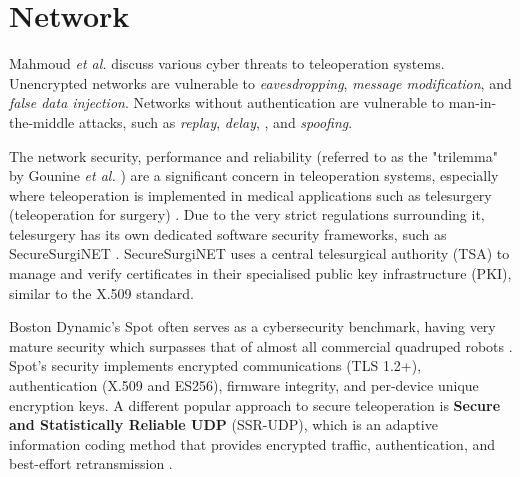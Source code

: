 \newpage
\section{Network}

Mahmoud \textit{et al.} \cite{bib:networks_survey} discuss various cyber threats to teleoperation systems. Unencrypted networks are vulnerable to \textit{eavesdropping}, \textit{message modification}, and \textit{false data injection}. Networks without authentication are vulnerable to man-in-the-middle attacks, such as \textit{replay}, \textit{delay}, , and \textit{spoofing}.


The network security, performance and reliability (referred to as the "trilemma" by Gounine \textit{et al.} \cite{bib:networks_surgery_2}) are a significant concern in teleoperation systems, especially where teleoperation is implemented in medical applications such as telesurgery (teleoperation for surgery) \cite{bib:networks_surgery}. Due to the very strict regulations surrounding it, telesurgery has its own dedicated software security frameworks, such as SecureSurgiNET \cite{bib:networks_SecureSurgiNET}. SecureSurgiNET uses a central telesurgical authority (TSA) to manage and verify certificates in their specialised public key infrastructure (PKI), similar to the X.509 standard.

Boston Dynamic's Spot often serves as a cybersecurity benchmark, having very mature security which surpasses that of almost all commercial quadruped robots \cite{bib:networks_survey_2}. Spot's security implements encrypted communications (TLS 1.2+), authentication (X.509 and ES256), firmware integrity, and per-device unique encryption keys. A different popular approach to secure teleoperation is \textbf{Secure and Statistically Reliable UDP} (SSR-UDP), which is an adaptive information coding method that provides encrypted traffic, authentication, and best-effort retransmission \cite{bib:networks_survey}.


